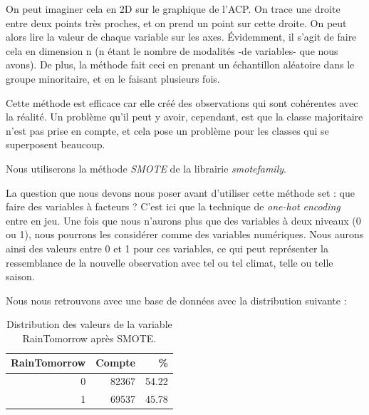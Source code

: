 \documentclass{article}
\begin{document}
On peut imaginer cela en 2D sur le graphique de l'ACP. On trace une droite entre deux points très proches, et on prend un point sur cette droite. On peut alors lire la valeur de chaque variable sur les axes. Évidemment, il s'agit de faire cela en dimension n (n étant le nombre de modalités -de variables- que nous avons). De plus, la méthode fait ceci en prenant un échantillon aléatoire dans le groupe minoritaire, et en le faisant plusieurs fois.

Cette méthode est efficace car elle créé des observations qui sont cohérentes avec la réalité. Un problème qu'il peut y avoir, cependant, est que la classe majoritaire n'est pas prise en compte, et cela pose un problème pour les classes qui se superposent beaucoup. 

Nous utiliserons la méthode \emph{SMOTE} de la librairie \emph{smotefamily}.

La question que nous devons nous poser avant d'utiliser cette méthode set : que faire des variables à facteurs ? C'est ici que la technique de \emph{one-hot encoding} entre en jeu. Une fois que nous n'aurons plus que des variables à deux niveaux (0 ou 1), nous pourrons les considérer comme des variables numériques. Nous aurons ainsi des valeurs entre 0 et 1 pour ces variables, ce qui peut représenter la ressemblance de la nouvelle observation avec tel ou tel climat, telle ou telle saison. 

Nous nous retrouvons avec une base de données avec la distribution suivante : 

\begin{table}[H]
    \centering
        \begin{tabular}{|rrr|}
            \hline
            RainTomorrow & Compte & \% \\ 
            \hline
            \hline
            0 & 82367 & 54.22 \\
            1 & 69537 & 45.78 \\
            \hline
        \end{tabular}
    \caption{Distribution des valeurs de la variable RainTomorrow après SMOTE.}
\end{table}
\end{document}
